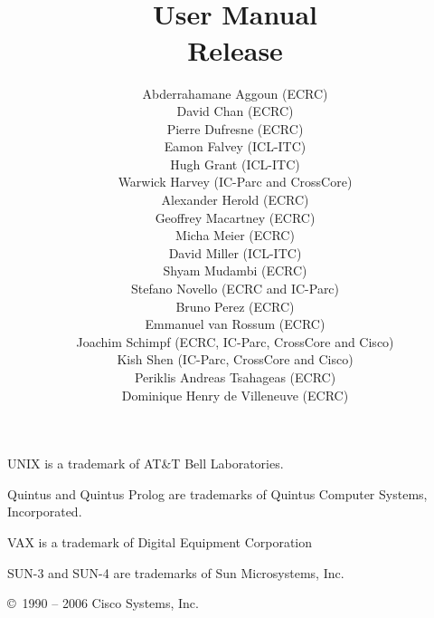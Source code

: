 \documentclass[11pt,a4paper]{book}
\title{
    {\Large\bf {\eclipse}}\\
    \vspace{1cm}
    {\Huge\bf User Manual}\\
    \vspace{1cm}
    Release \eclipseversion}
\author{
Abderrahamane Aggoun (ECRC) \\
David Chan (ECRC) \\
Pierre Dufresne (ECRC) \\
Eamon Falvey (ICL-ITC) \\
Hugh Grant (ICL-ITC) \\
Warwick Harvey (IC-Parc and CrossCore) \\
Alexander Herold (ECRC) \\
Geoffrey Macartney (ECRC) \\
Micha Meier (ECRC) \\
David Miller (ICL-ITC) \\
Shyam Mudambi (ECRC) \\
Stefano Novello (ECRC and IC-Parc) \\
Bruno Perez (ECRC) \\
Emmanuel van Rossum (ECRC) \\
Joachim Schimpf (ECRC, IC-Parc, CrossCore and Cisco) \\
Kish Shen (IC-Parc, CrossCore and Cisco)\\
Periklis Andreas Tsahageas (ECRC) \\
Dominique Henry de Villeneuve (ECRC) \\
}
\begin{document}
\nocite{sepex,eventh,environ,compnd,arch}


\maketitle


\setcounter{page}{2}
\pagestyle{empty}

\vfill
{}

\bigskip\bigskip
UNIX is a trademark of AT\&T Bell Laboratories.

Quintus and Quintus Prolog are trademarks of
Quintus Computer Systems, Incorporated.

VAX is a trademark of Digital Equipment Corporation

SUN-3 and SUN-4 are trademarks of Sun Microsystems, Inc.

\bigskip\bigskip\bigskip\bigskip\bigskip\bigskip

\copyright\ 1990 -- 2006 Cisco Systems, Inc.

\bigskip\bigskip\bigskip\bigskip\bigskip\bigskip

\cleardoublepage
\pagestyle{plain}

\tableofcontents

\cleardoublepage
{}







%

















\appendix




%



\newpage
\printindex

\newpage


\end{document}
